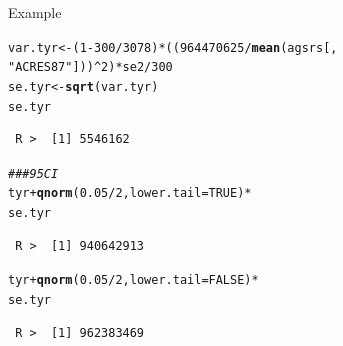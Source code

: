 \documentclass[10pt]{beamer}\usepackage[]{graphicx}\usepackage[]{xcolor}
\makeatletter
\newcommand{\hlnum}[1]{\textcolor[rgb]{0.686,0.059,0.569}{#1}}%
\newcommand{\hlstr}[1]{\textcolor[rgb]{0.192,0.494,0.8}{#1}}%
\newcommand{\hlcom}[1]{\textcolor[rgb]{0.678,0.584,0.686}{\textit{#1}}}%
\newcommand{\hlopt}[1]{\textcolor[rgb]{0,0,0}{#1}}%
\newcommand{\hlstd}[1]{\textcolor[rgb]{0.345,0.345,0.345}{#1}}%
\newcommand{\hlkwb}[1]{\textcolor[rgb]{0.69,0.353,0.396}{#1}}%
\newcommand{\hlkwc}[1]{\textcolor[rgb]{0.333,0.667,0.333}{#1}}%
\newcommand{\hlkwd}[1]{\textcolor[rgb]{0.737,0.353,0.396}{\textbf{#1}}}%
\newenvironment{kframe}{%
 \def\at@end@of@kframe{}%
 \ifinner\ifhmode%
  \def\at@end@of@kframe{\end{minipage}}%
  \begin{minipage}{\columnwidth}%
 \fi\fi%
 \def\FrameCommand##1{\hskip\@totalleftmargin \hskip-\fboxsep
 \colorbox{shadecolor}{##1}\hskip-\fboxsep
     \hskip-\linewidth \hskip-\@totalleftmargin \hskip\columnwidth}%
 \MakeFramed {\advance\hsize-\width
   \@totalleftmargin\z@ \linewidth\hsize
   \@setminipage}}%
 {\par\unskip\endMakeFramed%
 \at@end@of@kframe}
\newenvironment{knitrout}{}{} %
\makeatother
\begin{document}
\begin{frame}[containsverbatim]{Example}
\small
\begin{knitrout}
\color{fgcolor}\begin{kframe}
\begin{alltt}
\hlstd{var.tyr} \hlkwb{<-} \hlstd{(}\hlnum{1} \hlopt{-} \hlnum{300}\hlopt{/}\hlnum{3078}\hlstd{)} \hlopt{*} \hlstd{((}\hlnum{964470625}\hlopt{/}\hlkwd{mean}\hlstd{(agsrs[,}
    \hlstr{"ACRES87"}\hlstd{]))}\hlopt{^}\hlnum{2}\hlstd{)} \hlopt{*} \hlstd{se2}\hlopt{/}\hlnum{300}
\hlstd{se.tyr} \hlkwb{<-} \hlkwd{sqrt}\hlstd{(var.tyr)}
\hlstd{se.tyr}
\end{alltt}
\begin{verbatim}
 R >  [1] 5546162
\end{verbatim}
\begin{alltt}
\hlcom{### 95 CI}
\hlstd{tyr} \hlopt{+} \hlkwd{qnorm}\hlstd{(}\hlnum{0.05}\hlopt{/}\hlnum{2}\hlstd{,} \hlkwc{lower.tail} \hlstd{=} \hlnum{TRUE}\hlstd{)} \hlopt{*}
    \hlstd{se.tyr}
\end{alltt}
\begin{verbatim}
 R >  [1] 940642913
\end{verbatim}
\begin{alltt}
\hlstd{tyr} \hlopt{+} \hlkwd{qnorm}\hlstd{(}\hlnum{0.05}\hlopt{/}\hlnum{2}\hlstd{,} \hlkwc{lower.tail} \hlstd{=} \hlnum{FALSE}\hlstd{)} \hlopt{*}
    \hlstd{se.tyr}
\end{alltt}
\begin{verbatim}
 R >  [1] 962383469
\end{verbatim}
\end{kframe}
\end{knitrout}
\end{frame}
\end{document}
